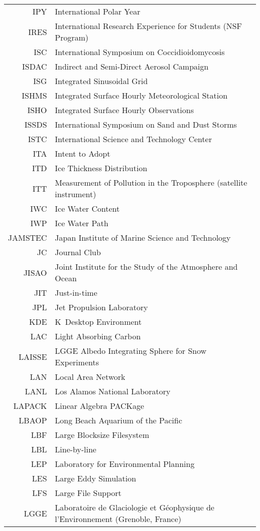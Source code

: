 \documentclass[12pt,twoside]{article}
\begin{document}
\begin{longtable}[>{\bfseries}l]{>{\ttfamily}r l}
IPY & International Polar Year \\
IRES & International Research Experience for Students (NSF Program) \\
ISC & International Symposium on Coccidioidomycosis \\
ISDAC & Indirect and Semi-Direct Aerosol Campaign \\
ISG & Integrated Sinusoidal Grid \\
ISHMS & Integrated Surface Hourly Meteorological Station \\
ISHO & Integrated Surface Hourly Observations \\
ISSDS & International Symposium on Sand and Dust Storms \\
ISTC & International Science and Technology Center \\
ITA & Intent to Adopt \\
ITD & Ice Thickness Distribution \\
ITT & Measurement of Pollution in the Troposphere (satellite instrument) \\
IWC & Ice Water Content \\
IWP & Ice Water Path \\
JAMSTEC & Japan Institute of Marine Science and Technology \\
JC & Journal Club \\
JISAO & Joint Institute for the Study of the Atmosphere and Ocean \\
JIT & Just-in-time \\
JPL & Jet Propulsion Laboratory \\
KDE & K~Desktop Environment \\
LAC & Light Absorbing Carbon \\
LAISSE & LGGE Albedo Integrating Sphere for Snow Experiments \\
LAN & Local Area Network \\
LANL & Los Alamos National Laboratory \\
LAPACK & Linear Algebra PACKage \\
LBAOP & Long Beach Aquarium of the Pacific \\
LBF & Large Blocksize Filesystem \\
LBL & Line-by-line \\
LEP & Laboratory for Environmental Planning \\
LES & Large Eddy Simulation \\
LFS & Large File Support \\
LGGE & Laboratoire de Glaciologie et G\'{e}ophysique de l'Environnement (Grenoble, France) \\

\end{longtable}
\end{document}
